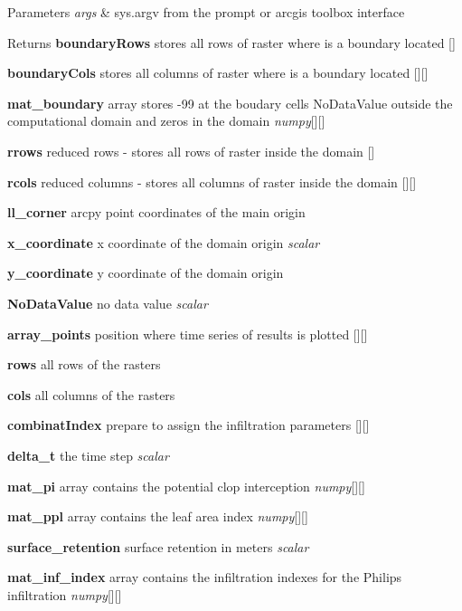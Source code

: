 \begin{DoxyParams}{Parameters}
{\em args} & sys.\-argv from the prompt or arcgis toolbox interface \\
\hline
\end{DoxyParams}
\begin{DoxyReturn}{Returns}
{\bfseries boundary\-Rows} stores all rows of raster where is a boundary located \mbox{[}\mbox{]} 

{\bfseries boundary\-Cols} stores all columns of raster where is a boundary located \mbox{[}\mbox{]}\mbox{[}\mbox{]} 

{\bfseries mat\-\_\-boundary} array stores -\/99 at the boudary cells No\-Data\-Value outside the computational domain and zeros in the domain {\itshape numpy}\mbox{[}\mbox{]}\mbox{[}\mbox{]} 

{\bfseries rrows} reduced rows -\/ stores all rows of raster inside the domain \mbox{[}\mbox{]} 

{\bfseries rcols} reduced columns -\/ stores all columns of raster inside the domain \mbox{[}\mbox{]}\mbox{[}\mbox{]} 

{\bfseries ll\-\_\-corner} arcpy point coordinates of the main origin 

{\bfseries x\-\_\-coordinate} x coordinate of the domain origin {\itshape scalar} 

{\bfseries y\-\_\-coordinate} y coordinate of the domain origin 

{\bfseries No\-Data\-Value} no data value {\itshape scalar} 

{\bfseries array\-\_\-points} position where time series of results is plotted \mbox{[}\mbox{]}\mbox{[}\mbox{]} 

{\bfseries rows} all rows of the rasters 

{\bfseries cols} all columns of the rasters 

{\bfseries combinat\-Index} prepare to assign the infiltration parameters \mbox{[}\mbox{]}\mbox{[}\mbox{]} 

{\bfseries delta\-\_\-t} the time step {\itshape scalar} 

{\bfseries mat\-\_\-pi} array contains the potential clop interception {\itshape numpy}\mbox{[}\mbox{]}\mbox{[}\mbox{]} 

{\bfseries mat\-\_\-ppl} array contains the leaf area index {\itshape numpy}\mbox{[}\mbox{]}\mbox{[}\mbox{]} 

{\bfseries surface\-\_\-retention} surface retention in meters {\itshape scalar} 

{\bfseries mat\-\_\-inf\-\_\-index} array contains the infiltration indexes for the Philips infiltration {\itshape numpy}\mbox{[}\mbox{]}\mbox{[}\mbox{]} 


\end{DoxyReturn}
